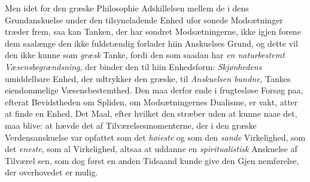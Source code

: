 Men idet for den græske Philosophie Adskillelsen mellem
de i dens Grundanskuelse under den tilsyneladende Enhed ufor\-%
sonede Modsætninger træder frem, saa kan Tanken, der har
sondret Modsætningerne, ikke igjen forene dem saalænge den
ikke fuldstændig forlader hiin Anskuelses Grund, og dette vil
den ikke kunne som \emph{græsk} Tanke, fordi den som saadan har
\emph{en naturbestemt Væsensbegrændsning}, der binder
den til hiin Enhedsform: \emph{Skjønhedens} umiddelbare Enhed,
der udtrykker den græske, til \emph{Anskuelsen bundne}, Tankes
eiendommelige Væsensbestemthed. Den maa derfor ende i
frugtesløse Forsøg paa, efterat Bevidstheden om Spliden, om
Modsætningernes Dualisme, er vakt, atter at finde en Enhed.
Det Maal, efter hvilket den stræber uden at kunne naae det,
maa blive: at hævde det af Tilværelsesmomenterne, der i den
græske Verdensanskuelse var opfattet som det \emph{høieste} og som
den \emph{sande} Virkelighed, som det \emph{eneste}, som al Virkelighed,
altsaa at uddanne en \emph{spiritualistisk} Anskuelse af Tilværel\-%
sen, som dog først en anden Tidsaand kunde give den Gjen\-%
nemførelse, der overhovedet er mulig.


